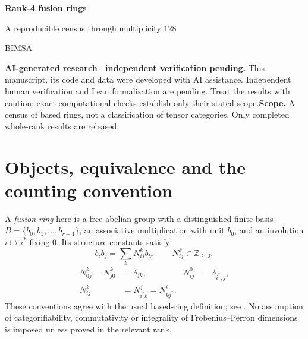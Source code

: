 \documentclass[11pt,a4paper]{article}
\theoremstyle{definition}\newtheorem{definition}[theorem]{Definition}\newtheorem{remark}[theorem]{Remark}
\newcommand{\NN}{\mathbb Z_{\geq0}}\newcommand{\FPdim}{\operatorname{FPdim}}
\begin{document}
\par\vspace{1cm}
{\sffamily\Huge\bfseries\color{ink} Rank-4 fusion rings\par}
\vspace{0.35cm}
{\sffamily\Large A reproducible census through multiplicity 128\par}
\vspace{0.65cm}{\large Sébastien Palcoux}\par{\small BIMSA}\par\vspace{0.35cm}{\small Computational companion, 26 October 2026}\par\vspace{0.8cm}
\begin{abstract}
We explain the exact enumeration of all based fusion rings of rank 4 through multiplicity 128, comprising 889,530 isomorphism classes. The account separates the mathematical coverage argument, the completed search, and independent verification of the emitted tensors. All duality types are included, and no categorifiability filter is applied. Code, machine-readable counts, full multiplication tensors and provenance records accompany the text.
\end{abstract}\vspace{0.4cm}\noindent\textbf{AI-generated research \textperiodcentered\ independent verification pending.} This manuscript, its code and data were developed with AI assistance. Independent human verification and Lean formalization are pending. Treat the results with caution: exact computational checks establish only their stated scope.\vfill\noindent\textbf{Scope.} A census of based rings, not a classification of tensor categories. Only completed whole-rank results are released.\newpage\tableofcontents\newpage

\section{Objects, equivalence and the counting convention}
A \emph{fusion ring} here is a free abelian group with a distinguished finite basis
$B=\{b_0,b_1,\ldots,b_{r-1}\}$, an associative multiplication with unit $b_0$,
and an involution $i\mapsto i^*$ fixing $0$. Its structure constants satisfy
\[
b_i b_j=\sum_k N_{ij}^{k}b_k,\qquad N_{ij}^{k}\in\NN,
\]
\begin{align}
N_{0j}^{k}=N_{j0}^{k}&=\delta_{jk},&N_{ij}^{0}&=\delta_{i^*,j},\\
N_{ij}^{k}&=N_{i^*k}^{j}=N_{kj^*}^{i}.&&\label{eq:reciprocity}
\end{align}
These conventions agree with the usual based-ring definition; see
\cite{EGNO,VS}. No assumption of categorifiability, commutativity or integrality
of Frobenius--Perron dimensions is imposed unless proved in the relevant rank.
\end{document}

